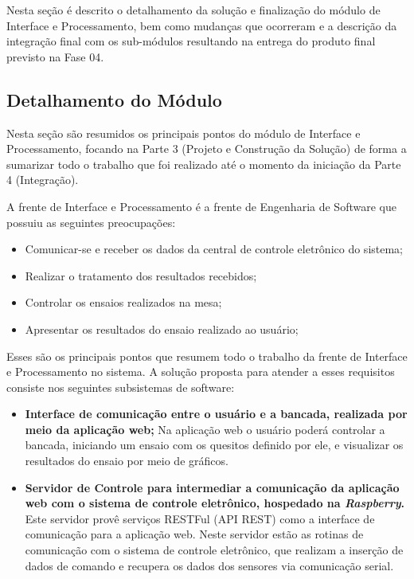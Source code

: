 \label{desenvolvimento_processamento}

Nesta seção é descrito o detalhamento da solução e finalização do módulo de Interface e Processamento,
bem como mudanças que ocorreram e a descrição da integração final com os sub-módulos resultando na
entrega do produto final previsto na Fase 04.

\subsection{Detalhamento do Módulo}

Nesta seção são resumidos os principais pontos do módulo de Interface e Processamento, focando na Parte 3 (Projeto e Construção da Solução)
de forma a sumarizar todo o trabalho que foi realizado até o momento da iniciação da Parte 4 (Integração).

A frente de Interface e Processamento é a frente de Engenharia de Software que possuiu as seguintes preocupações:

\begin{itemize}
  \item Comunicar-se e receber os dados da central de controle eletrônico do sistema;
  \item Realizar o tratamento dos resultados recebidos;
  \item Controlar os ensaios realizados na mesa;
  \item Apresentar os resultados do ensaio realizado ao usuário;
\end{itemize}

Esses são os principais pontos que resumem todo o trabalho da frente de Interface e Processamento no sistema.
A solução proposta para atender a esses requisitos consiste nos seguintes subsistemas de software:

\begin{itemize}
 \item \textbf{Interface de comunicação entre o usuário e a bancada, realizada por meio da aplicação web;}
      \subitem Na aplicação web o usuário poderá controlar a bancada, iniciando um ensaio com os quesitos definido por ele,
	       e visualizar os resultados do ensaio por meio de gráficos.
 \item \textbf{Servidor de Controle para intermediar a comunicação da aplicação web com o sistema de controle eletrônico, hospedado na \textit{Raspberry}.}
      \subitem Este servidor provê serviços RESTFul (API REST) como a interface de comunicação para a aplicação web. Neste servidor estão as 
	       rotinas de comunicação com o sistema de controle eletrônico, que realizam a inserção de dados de comando e recupera os dados 
	       dos sensores via comunicação serial.
\end{itemize}

